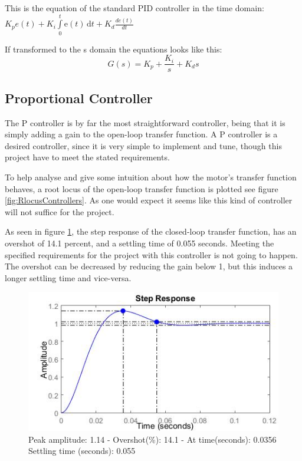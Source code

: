 This is the equation of the standard PID controller in the time domain:\\$K_{p}e(t)+K_{i} \int\limits_0^t \mathrm{e}(t)\,\mathrm{d}t+K_{d}\frac{de(t)}{dt}$

If transformed to the s domain the equations looks like this:\\

\begin{equation}G(s)=K_{p}+\frac{K_{i}}{s}+K_{d}s
\label{Eq_2}
\end{equation}

\subsection{Proportional Controller}

The P controller is by far the most straightforward controller, being that it is simply adding a gain to the open-loop transfer function. A P controller is a desired controller, since it is very simple to implement and tune, though this project have to meet the stated requirements.\par

To help analyse and give some intuition about how the motor’s transfer function behaves, a root locus of the open-loop transfer function is plotted see figure \ref{fig:RlocusControllers}. As one would expect it seems like this kind of controller will not suffice for the project.\par

As seen in figure \ref{fig:PStep}, the step response of the closed-loop transfer function, has an overshot of 14.1 percent, and a settling time of 0.055 seconds. Meeting the specified requirements  for the project with this controller is not going to happen. The overshot can be decreased by reducing the gain below 1, but this induces a longer settling time and vice-versa. 

\begin{figure}[h!]
\centering
\includegraphics[scale=0.7]{Billeder/PStep.jpg}
\caption{ Peak amplitude: 1.14 - Overshot(\%): 14.1 - At time(seconds): 0.0356
		 Settling time (seconds): 0.055 }
\label{fig:PStep}
\end{figure}

